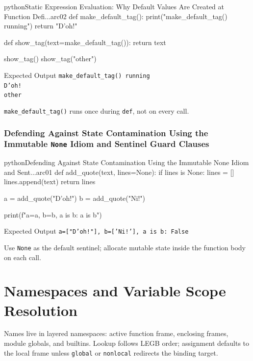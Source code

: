 \documentclass[a4paper,twoside]{report}
\begin{document}
\begin{codebox}[]{python}{Static Expression Evaluation: Why Default Values Are Created at Function Defi...}{arc02}
def make_default_tag():
    print("make_default_tag() running")
    return "D'oh!"

def show_tag(text=make_default_tag()):
    return text

show_tag()
show_tag("other")
\end{codebox}


\begin{iobox}{Expected Output}
\texttt{make\_default\_tag() running} \\
\texttt{D'oh!} \\
\texttt{other} \\
\end{iobox}




\texttt{make\_default\_tag()} runs once during \texttt{def}, not on every call.

\subsubsection{Defending Against State Contamination Using the Immutable \texttt{None} Idiom and Sentinel Guard Clauses}

\begin{codebox}[]{python}{Defending Against State Contamination Using the Immutable None Idiom and Sent...}{arc01}
def add_quote(text, lines=None):
    if lines is None:
        lines = []
    lines.append(text)
    return lines

a = add_quote("D'oh!")
b = add_quote("Ni!")

print(f"a={a}, b={b}, a is b: {a is b}")
\end{codebox}


\begin{iobox}{Expected Output}
\texttt{a=["D'oh!"], b=['Ni!'], a is b: False} \\
\end{iobox}




Use \texttt{None} as the default sentinel; allocate mutable state inside the function body on each call.


\section{Namespaces and Variable Scope Resolution}

Names live in layered namespaces: active function frame, enclosing frames, module globals, and builtins. Lookup follows LEGB order; assignment defaults to the local frame unless \texttt{global} or \texttt{nonlocal} redirects the binding target.
\end{document}
